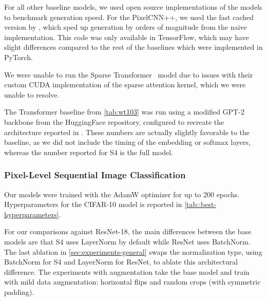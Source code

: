 \documentclass{article}
\newcommand{\methodabbrv}{S4}
\begin{document}
For all other baseline models, we used open source implementations of the models to benchmark generation speed.
For the PixelCNN++, we used the fast cached version by \citet{ramachandran2017fast},
which sped up generation by orders of magnitude from the naive implementation.
This code was only available in TensorFlow, which may have slight differences compared to the rest of the baselines which were implemented in PyTorch.

We were unable to run the Sparse Transformer~\citep{child2019generating} model due to issues with their custom CUDA implementation of the sparse attention kernel, which we were unable to resolve.

The Transformer baseline from \cref{tab:wt103} was run using a modified GPT-2 backbone from the HuggingFace repository, configured to recreate the architecture reported in \citep{baevski2018adaptive}.
These numbers are actually slightly favorable to the baseline, as we did not include the timing of the embedding or softmax layers, whereas the number reported for \methodabbrv{} is the full model.

\subsubsection{Pixel-Level Sequential Image Classification}
\label{sec:experiment-details-general-image}

Our models were trained with the AdamW optimizer for up to 200 epochs.
Hyperparameters for the CIFAR-10 model is reported in \cref{tab::best-hyperparameters}.

For our comparisons against ResNet-18, the main differences between the base models are that \methodabbrv{} uses LayerNorm by default while ResNet uses BatchNorm.
The last ablation in \cref{sec:experiments-general} swaps the normalization type,
using BatchNorm for \methodabbrv{} and LayerNorm for ResNet,
to ablate this architectural difference.
The experiments with augmentation take the base model and train with mild data augmentation: horizontal flips and random crops (with symmetric padding).
\end{document}
